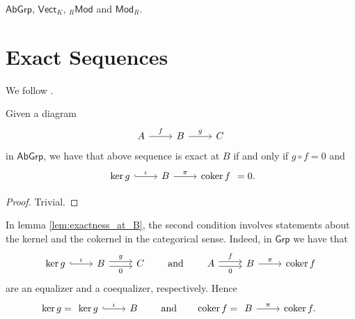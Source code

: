 \begin{examples}
	$\mathsf{AbGrp}$, $\mathsf{Vect}_K$, $_{R}\mathsf{Mod}$ and $\mathsf{Mod}_R$.	
\end{examples}

\section{Exact Sequences}
We follow \cite[44]{freyd:abelian_categories:1964}.

\begin{lemma}
	\label{lem:exactness_at_B}
	Given a diagram
	\begin{equation*}
		\begin{tikzcd}
			A \arrow[r,"f"] & B \arrow[r,"g"] & C
		\end{tikzcd}
	\end{equation*}
	\noindent in $\mathsf{AbGrp}$, we have that above sequence is exact at $B$ if and only if $g \circ f = 0$ and
	\begin{equation*}
		\begin{tikzcd}
			\ker g \arrow[r,hook,"\iota"] & B \arrow[r,"\pi"] & \coker f 
		\end{tikzcd} = 0.
	\end{equation*}
\end{lemma}

\begin{proof}
	Trivial.
\end{proof}

In lemma \ref{lem:exactness_at_B}, the second condition involves statements about the kernel and the cokernel in the categorical sense. Indeed, in $\mathsf{Grp}$ we have that 
\begin{equation*}
	\begin{tikzcd}
		\ker g \arrow[r,hook,"\iota"] & B \arrow[r, shift left, "g"]\arrow[r,shift right,"0"'] & C
	\end{tikzcd}
	\qquad \text{and} \qquad
	\begin{tikzcd}
		A \arrow[r, shift left, "f"]\arrow[r,shift right,"0"'] & B \arrow[r,"\pi"] & \coker f
	\end{tikzcd}
\end{equation*}
\noindent are an equalizer and a coequalizer, respectively. Hence
\begin{equation*}
	\ker g = \begin{tikzcd}
		\ker g \arrow[r,hook,"\iota"] & B
	\end{tikzcd} \qquad \text{and} \qquad \coker f = \begin{tikzcd}
		B \arrow[r,"\pi"] & \coker f.
	\end{tikzcd}
\end{equation*}

